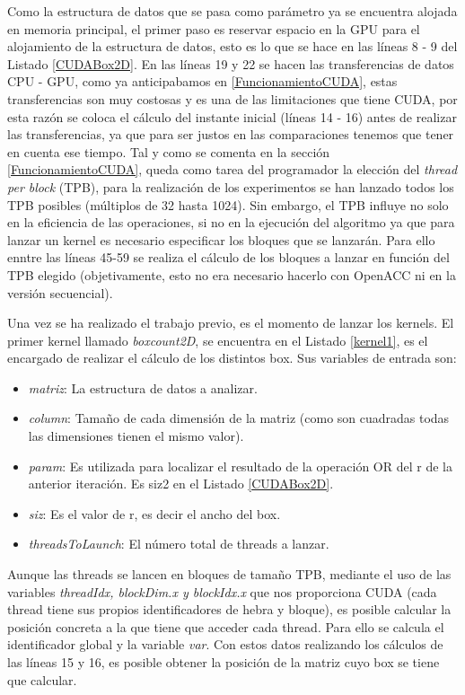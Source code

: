 Como la estructura de datos que se pasa como parámetro ya se encuentra alojada en memoria principal, el primer paso es reservar espacio en la GPU para el alojamiento de la estructura de datos, esto es lo que se hace en las líneas 8 - 9 del Listado \ref{CUDABox2D}. En las líneas 19 y 22 se hacen las transferencias de datos CPU - GPU, como ya anticipabamos en \ref{FuncionamientoCUDA}, estas transferencias son muy costosas y es una de las limitaciones que tiene CUDA, por esta razón se coloca el cálculo del instante inicial (líneas 14 - 16) antes de realizar las transferencias, ya que para ser justos en las comparaciones tenemos que tener en cuenta ese tiempo.
Tal y como se comenta en la sección \ref{FuncionamientoCUDA}, queda como tarea del programador la elección del \textit{thread per block} (TPB), para la realización de los experimentos se han lanzado todos los TPB posibles (múltiplos de 32 hasta 1024). Sin embargo, el TPB influye no solo en la eficiencia de las operaciones, si no en la ejecución del algoritmo ya que para lanzar un kernel es necesario especificar los bloques que se lanzarán. Para ello enntre las líneas 45-59 se realiza el cálculo de los bloques a lanzar en función del TPB elegido (objetivamente, esto no era necesario hacerlo con OpenACC ni en la versión secuencial).

Una vez se ha realizado el trabajo previo, es el momento de lanzar los kernels. El primer kernel llamado \textit{boxcount2D}, se encuentra en el Listado \ref{kernel1}, es el encargado de realizar el cálculo de los distintos box. Sus variables de entrada son:
\begin{itemize}
    \item \textit{matriz}: La estructura de datos a analizar.
    \item \textit{column}: Tamaño de cada dimensión de la matriz (como son cuadradas todas las dimensiones tienen el mismo valor).
    \item \textit{param}:  Es utilizada para localizar el resultado de la operación OR del r de la anterior iteración. Es siz2 en el Listado \ref{CUDABox2D}.
    \item \textit{siz}: Es el valor de r, es decir el ancho del box.
    \item \textit{threadsToLaunch}: El número total de threads a lanzar.
\end{itemize}

Aunque las threads se lancen en bloques de tamaño TPB, mediante el uso de las variables \textit{threadIdx, blockDim.x y blockIdx.x} que nos proporciona CUDA (cada thread tiene sus propios identificadores de hebra y bloque), es posible calcular la posición concreta a la que tiene que acceder cada thread. Para ello se calcula el identificador global y la variable \textit{var}. Con estos datos realizando los cálculos de las líneas 15 y 16, es posible obtener la posición de la matriz cuyo box se tiene que calcular.

